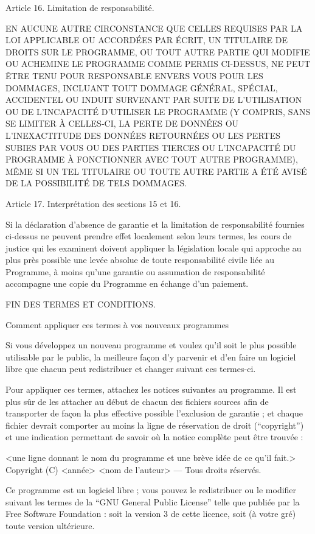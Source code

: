{Article 16. Limitation de responsabilité.

EN AUCUNE AUTRE CIRCONSTANCE QUE CELLES REQUISES PAR LA LOI APPLICABLE
OU ACCORDÉES PAR ÉCRIT, UN TITULAIRE DE DROITS SUR LE PROGRAMME, OU
TOUT AUTRE PARTIE QUI MODIFIE OU ACHEMINE LE PROGRAMME COMME PERMIS
CI-DESSUS, NE PEUT ÊTRE TENU POUR RESPONSABLE ENVERS VOUS POUR LES
DOMMAGES, INCLUANT TOUT DOMMAGE GÉNÉRAL, SPÉCIAL, ACCIDENTEL OU INDUIT
SURVENANT PAR SUITE DE L’UTILISATION OU DE L’INCAPACITÉ D’UTILISER LE
PROGRAMME (Y COMPRIS, SANS SE LIMITER À CELLES-CI, LA PERTE DE DONNÉES
OU L’INEXACTITUDE DES DONNÉES RETOURNÉES OU LES PERTES SUBIES PAR VOUS
OU DES PARTIES TIERCES OU L’INCAPACITÉ DU PROGRAMME À FONCTIONNER AVEC
TOUT AUTRE PROGRAMME), MÊME SI UN TEL TITULAIRE OU TOUTE AUTRE PARTIE
A ÉTÉ AVISÉ DE LA POSSIBILITÉ DE TELS DOMMAGES.


Article 17. Interprétation des sections 15 et 16.

Si la déclaration d’absence de garantie et la limitation de
responsabilité fournies ci-dessus ne peuvent prendre effet localement
selon leurs termes, les cours de justice qui les examinent doivent
appliquer la législation locale qui approche au plus près possible une
levée absolue de toute responsabilité civile liée au Programme, à moins
qu’une garantie ou assumation de responsabilité accompagne une copie du
Programme en échange d’un paiement.


FIN DES TERMES ET CONDITIONS.



Comment appliquer ces termes à vos nouveaux programmes

Si vous développez un nouveau programme et voulez qu’il soit le plus
possible utilisable par le public, la meilleure façon d’y parvenir et
d’en faire un logiciel libre que chacun peut redistribuer et changer
suivant ces termes-ci.

Pour appliquer ces termes, attachez les notices suivantes au programme.
Il est plus sûr de les attacher au début de chacun des fichiers sources
afin de transporter de façon la plus effective possible l’exclusion de
garantie ; et chaque fichier devrait comporter au moins la ligne de
réservation de droit (“copyright”) et une indication permettant de savoir
où la notice complète peut être trouvée :

  <une ligne donnant le nom du programme et une brève idée de ce qu’il fait.>
  Copyright (C) <année> <nom de l’auteur> — Tous droits réservés.
  
  Ce programme est un logiciel libre ; vous pouvez le redistribuer ou le
  modifier suivant les termes de la “GNU General Public License” telle que
  publiée par la Free Software Foundation : soit la version 3 de cette
  licence, soit (à votre gré) toute version ultérieure.
  
}
